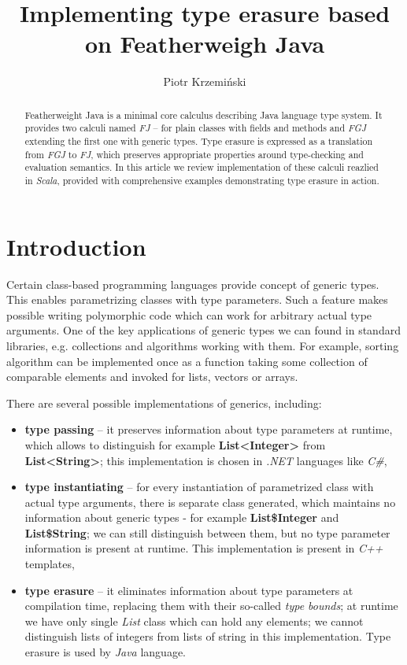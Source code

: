 \documentclass{article}[12pt]
\author{Piotr Krzemiński}
\title{Implementing type erasure based on Featherweigh Java}
\date{}
\begin{document}
\maketitle


\begin{abstract}
Featherweight Java is a minimal core calculus describing Java language
type system. It provides two calculi named \emph{FJ} -- for plain classes with fields and methods and \emph{FGJ} extending the first
one with generic types. Type erasure is expressed as a translation
from \emph{FGJ} to \emph{FJ}, which preserves appropriate properties
around type-checking and evaluation semantics. In this article
we review implementation of these calculi reazlied in \emph{Scala}, provided with comprehensive examples demonstrating type erasure in action.
\end{abstract}


\section{Introduction}

Certain class-based programming languages provide concept of generic types. This enables parametrizing classes with type parameters. Such a feature makes possible writing polymorphic code which can work for arbitrary actual type arguments. One of the key applications of generic types we can found in standard libraries, e.g. collections and algorithms working with them. For example, sorting algorithm can be implemented once as a function taking some collection of comparable elements and invoked for lists, vectors or arrays.

There are several possible implementations of generics, including:

\begin{itemize}

\item{\textbf{type passing}} -- it preserves information about type parameters at runtime, which allows to distinguish for example \textbf{List<Integer>} from \textbf{List<String>}; this implementation is chosen in \emph{.NET} languages like \emph{C\#},

\item{\textbf{type instantiating}} -- for every instantiation of parametrized class with actual type arguments, there is separate class generated, which maintains no information about generic types - for example \textbf{List\$Integer} and \textbf{List\$String}; we can still distinguish between them,
but no type parameter information is present at runtime. This implementation is present in \emph{C++} templates,

\item{\textbf{type erasure}} -- it eliminates information about type parameters at compilation time, replacing them with their so-called \emph{type bounds}; at runtime we have only single \emph{List} class which can hold any elements; we cannot distinguish lists of integers from lists of string in this implementation. Type erasure is used by \emph{Java} language.

\end{itemize}
\end{document}
